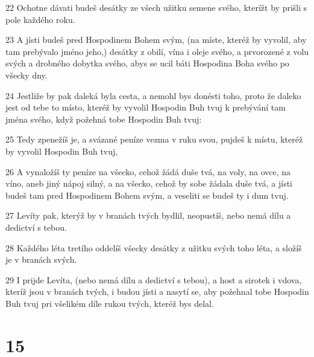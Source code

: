 \par 22 Ochotne dávati budeš desátky ze všech užitku semene svého, kterížt by prišli s pole každého roku.
\par 23 A jísti budeš pred Hospodinem Bohem svým, (na míste, kteréž by vyvolil, aby tam prebývalo jméno jeho,) desátky z obilí, vína i oleje svého, a prvorozené z volu svých a drobného dobytka svého, abys se ucil báti Hospodina Boha svého po všecky dny.
\par 24 Jestliže by pak daleká byla cesta, a nemohl bys donésti toho, proto že daleko jest od tebe to místo, kteréž by vyvolil Hospodin Buh tvuj k prebývání tam jména svého, když požehná tobe Hospodin Buh tvuj:
\par 25 Tedy zpenežíš je, a svázané peníze vezma v ruku svou, pujdeš k místu, kteréž by vyvolil Hospodin Buh tvuj,
\par 26 A vynaložíš ty peníze na všecko, cehož žádá duše tvá, na voly, na ovce, na víno, aneb jiný nápoj silný, a na všecko, cehož by sobe žádala duše tvá, a jísti budeš tam pred Hospodinem Bohem svým, a veseliti se budeš ty i dum tvuj.
\par 27 Levíty pak, kterýž by v branách tvých bydlil, neopustíš, nebo nemá dílu a dedictví s tebou.
\par 28 Každého léta tretího oddelíš všecky desátky z užitku svých toho léta, a složíš je v branách svých.
\par 29 I prijde Levíta, (nebo nemá dílu a dedictví s tebou), a host a sirotek i vdova, kteríž jsou v branách tvých, i budou jísti a nasytí se, aby požehnal tobe Hospodin Buh tvuj pri všelikém díle rukou tvých, kteréž bys delal.

\chapter{15}

